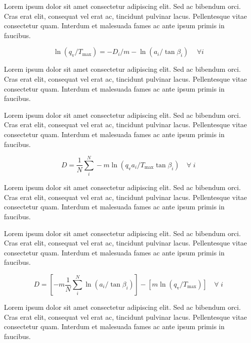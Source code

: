 \documentclass[./main.tex]{subfiles}
\begin{document}
\par Lorem ipsum dolor sit amet consectetur adipiscing elit. Sed ac bibendum orci. Cras erat elit, consequat vel erat ac, tincidunt pulvinar lacus. Pellentesque vitae consectetur quam. Interdum et malesuada fames ac ante ipsum primis in faucibus.
\begin{linenomath*}
\begin{equation}
\label{eq:topmodel:plug1}
\ln(q_{\text{v}}/T_{\text{max}}) = - D_{i}/m - \ln(a_{i} / \tan \beta_{i})  \quad \, \forall i
\end{equation}
\end{linenomath*}
Lorem ipsum dolor sit amet consectetur adipiscing elit. Sed ac bibendum orci. Cras erat elit, consequat vel erat ac, tincidunt pulvinar lacus. Pellentesque vitae consectetur quam. Interdum et malesuada fames ac ante ipsum primis in faucibus.

\par Lorem ipsum dolor sit amet consectetur adipiscing elit. Sed ac bibendum orci. Cras erat elit, consequat vel erat ac, tincidunt pulvinar lacus. Pellentesque vitae consectetur quam. Interdum et malesuada fames ac ante ipsum primis in faucibus.
\begin{linenomath*}
\begin{equation}
\label{eq:topmodel:d2}
D = \frac{1}{N} \sum^{N}_{i} -m \ln{(q_{\text{v}} a_{i} /T_{\text{max}}\tan \beta_{i})} \quad  \forall \; i 
\end{equation}
\end{linenomath*}
Lorem ipsum dolor sit amet consectetur adipiscing elit. Sed ac bibendum orci. Cras erat elit, consequat vel erat ac, tincidunt pulvinar lacus. Pellentesque vitae consectetur quam. Interdum et malesuada fames ac ante ipsum primis in faucibus.

\par Lorem ipsum dolor sit amet consectetur adipiscing elit. Sed ac bibendum orci. Cras erat elit, consequat vel erat ac, tincidunt pulvinar lacus. Pellentesque vitae consectetur quam. Interdum et malesuada fames ac ante ipsum primis in faucibus.
\begin{linenomath*}
\begin{equation}
\label{eq:topmodel:d2}
D = \left[ -m\frac{1}{N} \sum^{N}_{i} \ln{(a_{i}/\tan \beta_{i})}\right]  - \left[m \ln{(q_{\text{v}} /T_{\text{max}})}\right] \quad  \forall \; i 
\end{equation}
\end{linenomath*}
Lorem ipsum dolor sit amet consectetur adipiscing elit. Sed ac bibendum orci. Cras erat elit, consequat vel erat ac, tincidunt pulvinar lacus. Pellentesque vitae consectetur quam. Interdum et malesuada fames ac ante ipsum primis in faucibus.
\end{document}

